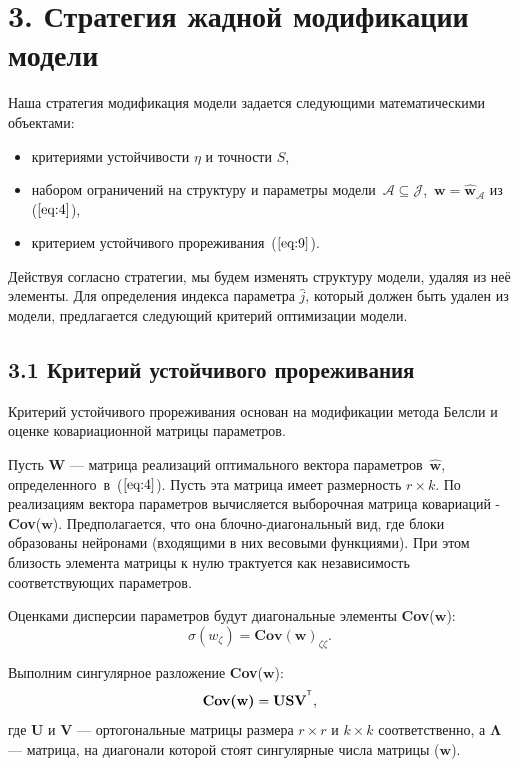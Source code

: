 \documentclass[12pt]{article}
\begin{document}
\section{3. Стратегия жадной модификации модели}
Наша стратегия модификация модели задается следующими математическими объектами:
\begin{itemize}
\item критериями устойчивости $\eta$ и точности $S$,
\item набором ограничений на структуру и параметры модели~$\mathcal{A} \subseteq \mathcal{J}$,~$\mathbf{w} = \mathbf{\hat{w}}_{\mathcal{A}}$ из ($\ref{eq:4}$),
\item критерием устойчивого прореживания~($\ref{eq:9}$).
\end{itemize}
Действуя согласно стратегии, мы будем изменять структуру модели, удаляя из неё элементы. Для определения индекса параметра $\hat{j}$, который должен быть удален из модели, предлагается следующий критерий оптимизации модели.

\subsection{3.1 Критерий устойчивого прореживания}
Критерий устойчивого прореживания основан на модификации метода Белсли и оценке ковариационной матрицы параметров.

Пусть $\mathbf{W}$  --- матрица реализаций оптимального вектора параметров~$\mathbf{\hat{w}}$, определенного~в~($\ref{eq:4}$). Пусть эта матрица имеет размерность $r \times k$. По реализациям вектора параметров вычисляется выборочная матрица ковариаций - \textbf{Cov}($\mathbf{w}$). Предполагается, что она блочно-диагональный вид, где блоки образованы нейронами (входящими в них весовыми функциями). При этом близость элемента матрицы к нулю трактуется как независимость соответствующих параметров.

Оценками дисперсии параметров будут диагональные элементы \textbf{Cov}($\mathbf{w}$):
\begin{equation*}
\sigma(w_{\zeta}) = \textbf{Cov}(\mathbf{w})_{\zeta \zeta}.
\end{equation*}

Выполним сингулярное разложение \textbf{Cov}($\mathbf{w}$):
\begin{equation}
\label{eq:8}
\textbf{Cov(w)} = \mathbf{U}\mathbf{S}\mathbf{V}^{\T},
\end{equation}
где $\mathbf{U}$ и $\mathbf{V}$ --- ортогональные матрицы размера $r \times r$ и $k \times k$ соответственно, а $\mathbf{\Lambda}$ --- матрица, на диагонали которой стоят сингулярные числа матрицы ($\mathbf{w}$).
\end{document}
